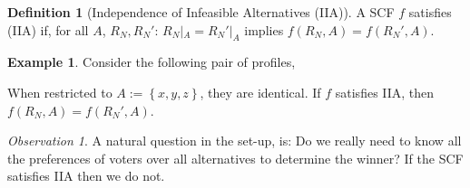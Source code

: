 \documentclass{book}
\theoremstyle{plain}
\theoremstyle{definition}
\newtheorem{definition}[theorem]{Definition}
\newtheorem{example}[theorem]{Example}
\theoremstyle{remark}
\newtheorem{observation}[theorem]{Observation}
\newcommand{\set}[1]{\left\{#1\right\}}
\begin{document}
\begin{definition}[Independence of Infeasible Alternatives (IIA)]
    A SCF $f$ satisfies (IIA)
    if, 
    for all $A$, $R_N, R_N'$:
    $R_N |_A = R_N' |_A$ implies $f(R_N, A) = f(R_N', A)$.
\end{definition}


\begin{example}
    Consider the following pair of profiles,


    When restricted to 
    $A := \set{x, y, z}$,
    they are identical.
    If 
    $f$ satisfies IIA, then $f(R_N, A) = f(R_N', A)$.
\end{example}

\begin{observation}
    A natural question in the set-up, 
    is: Do we really need to know 
    all the preferences of voters over 
    all alternatives to determine the winner?
    If the SCF satisfies IIA then 
    we do not.
\end{observation}
\end{document}
